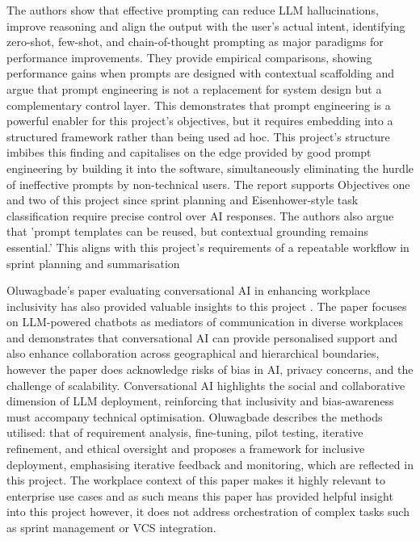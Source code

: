 \documentclass{report}
\begin{document}
The authors show that effective prompting can reduce LLM hallucinations, improve reasoning and align the output with the user's actual intent, identifying zero-shot, few-shot, and chain-of-thought prompting as major paradigms for performance improvements. They provide empirical comparisons, showing performance gains when prompts are designed with contextual scaffolding and argue that prompt engineering is not a replacement for system design but a complementary control layer. This demonstrates that prompt engineering is a powerful enabler for this project's objectives, but it requires embedding into a structured framework rather than being used ad hoc. This project's structure imbibes this finding and capitalises on the edge provided by good prompt engineering by building it into the software, simultaneously eliminating the hurdle of ineffective prompts by non-technical users. The report supports Objectives one and two of this project since sprint planning and Eisenhower-style task classification require precise control over AI responses. The authors also argue that 'prompt templates can be reused, but contextual grounding remains essential.' \parencite{whitePromptPatternCatalog2023} This aligns with this project's requirements of a repeatable workflow in sprint planning and summarisation

Oluwagbade's paper evaluating conversational AI in enhancing workplace inclusivity has also provided valuable insights to this project \parencite{oluwagbadeConversationalAINew2024}. The paper focuses on LLM-powered chatbots as mediators of communication in diverse workplaces and demonstrates that conversational AI can provide personalised support and also enhance collaboration across geographical and hierarchical boundaries, however the paper does acknowledge risks of bias in AI, privacy concerns, and the challenge of scalability. Conversational AI highlights the social and collaborative dimension of LLM deployment, reinforcing that inclusivity and bias-awareness must accompany technical optimisation. Oluwagbade describes the methods utilised: that of requirement analysis, fine-tuning, pilot testing, iterative refinement, and ethical oversight and proposes a framework for inclusive deployment, emphasising iterative feedback and monitoring, which are reflected in this project. The workplace context of this paper makes it highly relevant to enterprise use cases and as such means this paper has provided helpful insight into this project however, it does not address orchestration of complex tasks such as sprint management or VCS integration. 
\end{document}
